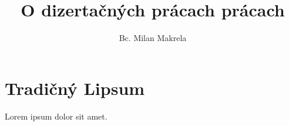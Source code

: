 \documentclass{rnthesis}
\title{O dizertačných prácach prácach}
\author{Bc. Milan Makrela}
\begin{document}
\maketitle
\newpage
\chapter{Tradičný Lipsum}
Lorem ipsum dolor sit amet.
\end{document}
